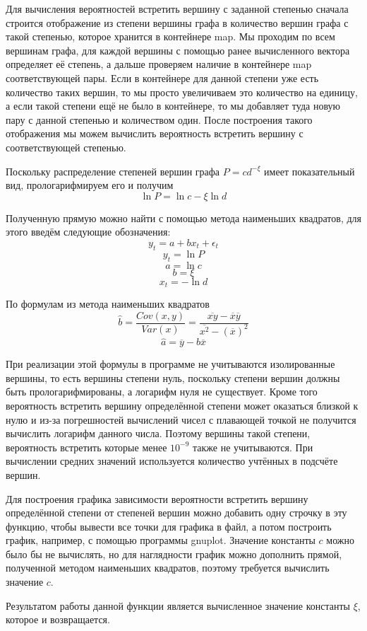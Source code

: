 \documentclass[14pt]{extreport}
\begin{document}
Для вычисления вероятностей встретить вершину с заданной степенью сначала строится отображение из степени вершины графа в количество вершин графа с такой степенью, которое хранится в контейнере map. Мы проходим по всем вершинам графа, для каждой вершины с помощью ранее вычисленного вектора определяет её степень, а дальше проверяем наличие в контейнере map соответствующей пары. Если в контейнере для данной степени уже есть количество таких вершин, то мы просто увеличиваем это количество на единицу, а если такой степени ещё не было в контейнере, то мы добавляет туда новую пару с данной степенью и количеством один. После построения такого отображения мы можем вычислить вероятность встретить вершину с соответствующей степенью.

Поскольку распределение степеней вершин графа $P = c d^{-\xi}$ имеет показательный вид, прологарифмируем его и получим
$$
\ln{P} = \ln{c} - \xi \ln{d}
$$

Полученную прямую можно найти с помощью метода наименьших квадратов, для этого введём следующие обозначения:
$$
y_t = a + b x_t + \epsilon_t
$$
$$
y_t = \ln{P}
$$
$$
a = \ln{c}
$$
$$
b = \xi
$$
$$
x_t = -\ln{d}
$$

По формулам из метода наименьших квадратов
$$
\hat{b} = \frac{Cov(x,y)}{Var(x)} = \frac{\overline{x y}-\overline{x}\overline{y}}{\overline{x^2}-\left(\overline{x}\right)^2}
$$
$$
\hat{a} = \overline{y} - b\overline{x}
$$

При реализации этой формулы в программе не учитываются изолированные вершины, то есть вершины степени нуль, поскольку степени вершин должны быть прологарифмированы, а логарифм нуля не существует. Кроме того вероятность встретить вершину определённой степени может оказаться близкой к нулю и из-за погрешностей вычислений чисел с плавающей точкой не получится вычислить логарифм данного числа. Поэтому вершины такой степени, вероятность встретить которые менее $10^{-9}$ также не учитываются. При вычислении средних значений используется количество учтённых в подсчёте вершин.

Для построения графика зависимости вероятности встретить вершину определённой степени от степеней вершин можно добавить одну строчку в эту функцию, чтобы вывести все точки для графика в файл, а потом построить график, например, с помощью программы gnuplot. Значение константы $c$ можно было бы не вычислять, но для наглядности график можно дополнить прямой, полученной методом наименьших квадратов, поэтому требуется вычислить значение $c$.

Результатом работы данной функции является вычисленное значение константы $\xi$, которое и возвращается.
\end{document}
